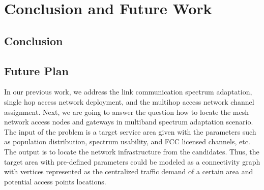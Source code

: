 \chapter{Conclusion and Future Work} 
\label{ch:conclusion}


\section{Conclusion}


\section{Future Plan}
In our previous work, we address the link communication spectrum adaptation, 
single hop access network deployment, and the multihop access network channel
assignment. Next, we are going to answer the question how to locate the mesh
network access nodes and gateways in multiband spectrum adaptation scenario.
The input of the problem is a target service area given with the parameters 
such as population distribution, spectrum usability, and FCC licensed channels, 
etc. The output is to locate the network infrastructure from the candidates.
Thus, the target area with pre-defined parameters could be modeled as a 
connectivity graph with vertices represented as the centralized traffic demand 
of a certain area and potential access points locations. 

